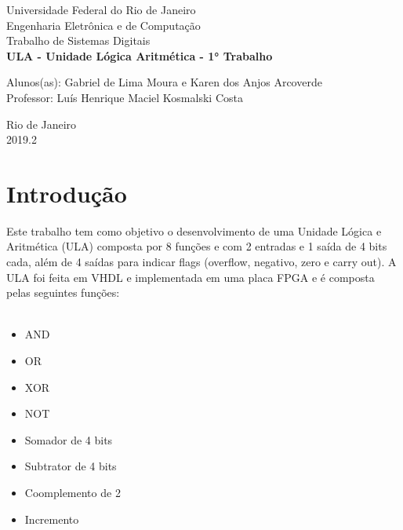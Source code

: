 \documentclass[a4paper,12pt,twoside]{article}
\date{}
\begin{document}
\begin{titlepage}
\begin{center}
{\large Universidade Federal do Rio de Janeiro}\\[0.2cm]
{\large Engenharia Eletrônica e de Computação}\\[0.2cm]
{\large Trabalho de Sistemas Digitais}\\[5.1cm]
{\bf \huge ULA - Unidade Lógica Aritmética - 1° Trabalho}\\[5.1cm]
\end{center}
{\large Alunos(as): Gabriel de Lima Moura e Karen dos Anjos Arcoverde}\\[0.7cm]
{\large Professor: Luís Henrique Maciel Kosmalski Costa}\\[5.1cm]
\begin{center}
{\large Rio de Janeiro}\\[0.2cm]
{\large 2019.2}
\end{center}
\end{titlepage}

\renewcommand{\contentsname}{Sumário}

\tableofcontents
\clearpage


\section{Introdução}
Este trabalho tem como objetivo o desenvolvimento de uma Unidade Lógica e Aritmética (ULA) composta por 8 funções e com 2 entradas e 1 saída de 4 bits cada, além de 4 saídas para indicar flags (overflow, negativo, zero e carry out). 
A ULA foi feita em VHDL e implementada em uma placa FPGA e é composta pelas seguintes funções: \\ \\
 \begin{itemize}
   \item AND
   \item OR
   \item XOR
   \item NOT
   \item Somador de 4 bits
   \item Subtrator de 4 bits
   \item Coomplemento de 2
   \item Incremento
 \end{itemize}
\end{document}
